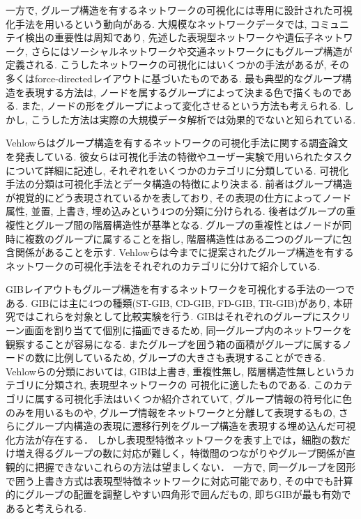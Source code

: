 \documentclass{kuee}
\begin{document}
一方で, グループ構造を有するネットワークの可視化には専用に設計された可視化手法を用いるという動向がある.
大規模なネットワークデータでは, コミュニテイ検出の重要性は周知であり\cite{girvan2002community,newman2004detecting}, 先述した表現型ネットワークや遺伝子ネットワーク, さらにはソーシャルネットワークや交通ネットワークにもグループ構造が定義される.
こうしたネットワークの可視化にはいくつかの手法があるが, その多くはforce-directedレイアウトに基づいたものである.
最も典型的なグループ構造を表現する方法は, ノードを属するグループによって決まる色で描くものである\cite{mcpherson2005discovering}.
また, ノードの形をグループによって変化させるという方法も考えられる.
しかし, こうした方法は実際の大規模データ解析では効果的でないと知られている.

Vehlowらはグループ構造を有するネットワークの可視化手法に関する調査論文を発表している\cite{Vehlow2017VisualizingGS}.
彼女らは可視化手法の特徴やユーザー実験で用いられたタスクについて詳細に記述し, それぞれをいくつかのカテゴリに分類している.
可視化手法の分類は可視化手法とデータ構造の特徴により決まる.
前者はグループ構造が視覚的にどう表現されているかを表しており, その表現の仕方によってノード属性, 並置, 上書き, 埋め込みという4つの分類に分けられる.
後者はグループの重複性とグループ間の階層構造性が基準となる.
グループの重複性とはノードが同時に複数のグループに属することを指し, 階層構造性はある二つのグループに包含関係があることを示す.
Vehlowらは今までに提案されたグループ構造を有するネットワークの可視化手法をそれぞれのカテゴリに分けて紹介している.

GIBレイアウトもグループ構造を有するネットワークを可視化する手法の一つである\cite{chaturvedi2014group,onoue2017optimal,rodrigues2011group}.
GIBには主に4つの種類(ST-GIB, CD-GIB, FD-GIB, TR-GIB)があり, 本研究ではこれらを対象として比較実験を行う.
GIBはそれぞれのグループにスクリーン画面を割り当てて個別に描画できるため, 同一グループ内のネットワークを観察することが容易になる.
またグループを囲う箱の面積がグループに属するノードの数に比例しているため, グループの大きさも表現することができる.
Vehlowらの分類においては, GIBは上書き, 重複性無し, 階層構造性無しというカテゴリに分類され, 表現型ネットワークの
可視化に適したものである.
このカテゴリに属する可視化手法はいくつか紹介されていて\cite{chaturvedi2014group,henry2007nodetrix,shneiderman2006network,bach2013graphdiaries,dekker2001visualisation}, グループ情報の符号化に色のみを用いるものや, グループ情報をネットワークと分離して表現するもの, さらにグループ内構造の表現に遷移行列をグループ構造を表現する埋め込んだ可視化方法が存在する．
しかし表現型特徴ネットワークを表す上では，細胞の数だけ増え得るグループの数に対応が難しく，特徴間のつながりやグループ関係が直観的に把握できないこれらの方法は望ましくない．
一方で, 同一グループを図形で囲う上書き方式は表現型特徴ネットワークに対応可能であり, その中でも計算的にグループの配置を調整しやすい四角形で囲んだもの, 即ちGIBが最も有効であると考えられる.
\end{document}

